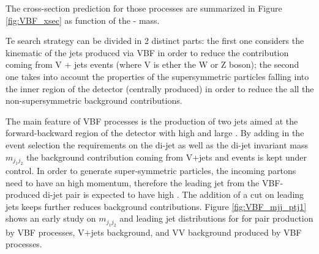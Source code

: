 The cross-section prediction for those processes are summarized in Figure \ref{fig:VBF_xsec} as function of the \charginomp - \neutralinotwo mass.

Te search strategy can be divided in 2 distinct parts: the first one considers the kinematic of the jets produced via VBF in order to reduce the contribution coming  from V + jets events (where V is ether the W or Z boson); the second one takes into account the properties of the supersymmetric particles falling into the inner region of the detector (centrally produced) in order to reduce the all the non-supersymmetric background contributions.

The main feature of VBF processes is the production of two jets aimed at the forward-backward region of the detector with high \pt and large \deltaeta. By adding in the event selection the requirements on the di-jet \deltaeta as well as the di-jet invariant mass \ensuremath{m_{j_{1}j_{2}}} the background contribution coming from V+jets and \ttbar events is kept under control. In order to generate super-symmetric particles, the incoming partons need to have an high momentum, therefore the leading jet from the VBF-produced di-jet pair is expected to have high \pt. The addition of a \pt cut on leading jets keeps further reduces background contributions. Figure \ref{fig:VBF_mjj_ptj1} shows an early study on \ensuremath{m_{j_{1}j_{2}}} and leading jet \pt distributions for for \charginopm \charginopm pair production by VBF processes, V+jets background, and VV background produced by VBF processes.

